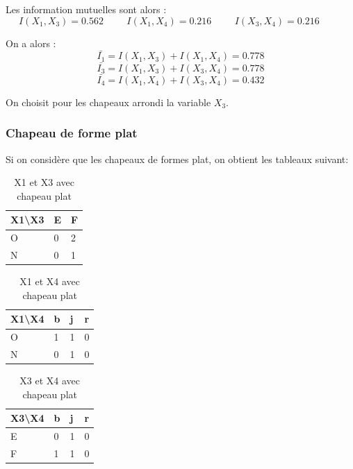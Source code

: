 \documentclass{article}
\begin{document}
Les information mutuelles sont alors :
\[
  I(X_1,X_3)=0.562 \hspace{1cm} I(X_1,X_4)=0.216 \hspace{1cm} I(X_3,X_4)=0.216 \hspace{1cm}
\]

On a alors :
\[
\bar{I_1}=I(X_1,X_3) + I(X_1,X_4)= 0.778 
\]
\[
\bar{I_3}=I(X_1,X_3) + I(X_3,X_4)= 0.778
\]
\[
\bar{I_4}=I(X_1,X_4) + I(X_3,X_4)= 0.432
\]

On choisit pour les chapeaux arrondi la variable $X_3$.
    


\subsubsection{Chapeau de forme plat}
Si on considère que les chapeaux de formes plat, on obtient les tableaux suivant: 

\begin{table}[H]
  \centering
  \caption{X1 et X3 avec chapeau plat}
  \begin{tabular}{|l|l|l|}
  \hline
  X1\textbackslash{}X3 & E & F \\ \hline
  O                    & 0 & 2 \\ \hline
  N                    & 0 & 1 \\ \hline
  \end{tabular}
\end{table}

\begin{table}[h]
  \centering
  \caption{X1 et X4 avec chapeau plat}
  \begin{tabular}{|l|l|l|l|}
  \hline
  X1\textbackslash{}X4 & b & j & r \\ \hline
  O                    & 1 & 1 & 0 \\ \hline
  N                    & 0 & 1 & 0 \\ \hline
  \end{tabular}
\end{table}

\begin{table}[h]
  \centering
  \caption{X3 et X4 avec chapeau plat}
  \begin{tabular}{|l|l|l|l|}
  \hline
  X3\textbackslash{}X4 & b & j & r \\ \hline
  E                    & 0 & 1 & 0 \\ \hline
  F                    & 1 & 1 & 0 \\ \hline
  \end{tabular}
\end{table}
\end{document}
